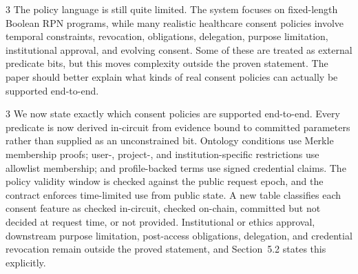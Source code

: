 \begin{reviewcomment}{3}
	The policy language is still quite limited.
	The system focuses on fixed-length Boolean RPN programs, while many realistic healthcare consent policies involve temporal constraints, revocation, obligations, delegation, purpose limitation, institutional approval, and evolving consent.
	Some of these are treated as external predicate bits, but this moves complexity outside the proven statement.
	The paper should better explain what kinds of real consent policies can actually be supported end-to-end.
\end{reviewcomment}

\begin{reviewresponse}{3}
	We now state exactly which consent policies are supported end-to-end.
	Every predicate is now derived in-circuit from evidence bound to committed parameters rather than supplied as an unconstrained bit.
	Ontology conditions use Merkle membership proofs; user-, project-, and institution-specific restrictions use allowlist membership; and profile-backed terms use signed credential claims.
	The policy validity window is checked against the public request epoch, and the contract enforces time-limited use from public state.
	A new table classifies each consent feature as checked in-circuit, checked on-chain, committed but not decided at request time, or not provided.
	Institutional or ethics approval, downstream purpose limitation, post-access obligations, delegation, and credential revocation remain outside the proved statement, and Section~5.2 states this explicitly.

\end{reviewresponse}
